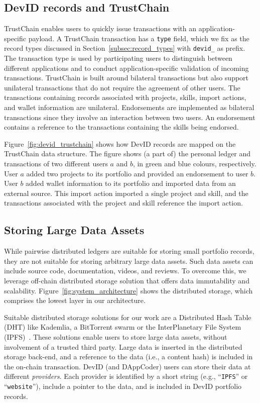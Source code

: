 \subsection{DevID records and TrustChain}
\label{subsec:devid_record_specs}
TrustChain enables users to quickly issue transactions with an application-specific payload.
A TrustChain transaction has a \texttt{type} field, which we fix as the record types discussed in Section~\ref{subsec:record_types} with \texttt{devid\_} as prefix.
The transaction type is used by participating users to distinguish between different applications and to conduct application-specific validation of incoming transactions.
TrustChain is built around bilateral transactions but also support unilateral transactions that do not require the agreement of other users.
The transactions containing records associated with projects, skills, import actions, and wallet information are unilateral.
Endorsements are implemented as bilateral transactions since they involve an interaction between two users.
An endorsement contains a reference to the transactions containing the skills being endorsed.

Figure~\ref{fig:devid_trustchain} shows how DevID records are mapped on the TrustChain data structure.
The figure shows (a part of) the personal ledger and transactions of two different users $ a $ and $ b $, in green and blue colours, respectively.
User $ a $ added two projects to its portfolio and provided an endorsement to user $ b $.
User $ b $ added wallet information to its portfolio and imported data from an external source.
This import action imported a single project and skill, and the transactions associated with the project and skill reference the import action.

\subsection{Storing Large Data Assets}
While pairwise distributed ledgers are suitable for storing small portfolio records, they are not suitable for storing arbitrary large data assets.
Such data assets can include source code, documentation, videos, and reviews.
To overcome this, we leverage off-chain distributed storage solution that offers data immutability and scalability.
Figure~\ref{fig:system_architecture} shows the distributed storage, which comprises the lowest layer in our architecture.

Suitable distributed storage solutions for our work are a Distributed Hash Table (DHT) like Kademlia, a BitTorrent swarm or the InterPlanetary File System (IPFS)~\cite{maymounkov2002kademlia,cohen2008bittorrent,benet2014ipfs}.
These solutions enable users to store large data assets, without involvement of a trusted third party.
Large data is inserted in the distributed storage back-end, and a reference to the data (i.e., a content hash) is included in the on-chain transaction.
DevID (and DAppCoder) users can store their data at different \emph{providers}.
Each provider is identified by a short string (e.g., \enquote{\texttt{IPFS}} or \enquote{\texttt{website}}), include a pointer to the data, and is included in DevID portfolio records.

